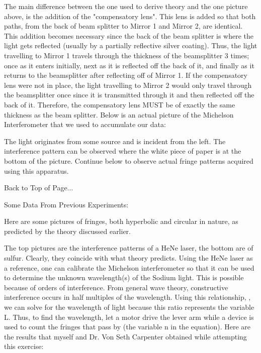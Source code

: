 The main difference between the one used to derive theory and the one picture above, is the addition of the "compensatory lens".   This lens is added so that both paths, from the back of beam splitter to Mirror 1 and Mirror 2, are identical.  This addition becomes necessary since the back of the beam splitter is where the light gets reflected (usually by a partially reflective silver coating).   Thus, the light travelling to Mirror 1 travels through the thickness of the beamsplitter 3 times; once as it enters initially, next as it is reflected off the back of it, and finally as it returns to the beamsplitter after reflecting off of Mirror 1.   If the compensatory lens were not in place, the light travelling to Mirror 2 would only travel through the beamsplitter once since it is transmitted through it and then reflected off the back of it.  Therefore, the compensatory lens MUST be of exactly the same thickness as the beam splitter.  Below is an actual picture of the Michelson Interferometer that we used to accumulate our data:



 

    The light originates from some source and is incident from the left.   The interference pattern can be observed where the white piece of paper is at the bottom of the picture.  Continue below to observe actual fringe patterns acquired using this apparatus. 

Back to Top of Page...

Some Data From Previous Experiments:

    Here are some pictures of fringes, both hyperbolic and circular in nature, as predicted by the theory discussed earlier.





    The top pictures are the interference patterns of a HeNe laser, the bottom are of sulfur.  Clearly, they coincide with what theory predicts.  Using the HeNe laser as a reference, one can calibrate the Michelson interferometer so that it can be used to determine the unknown wavelength(s) of the Sodium light. This is possible because of orders of interference.  From general wave theory, constructive interference occurs in half multiples of the wavelength.  Using this relationship, , we can solve for the wavelength of light because this ratio represents the variable L.  Thus, to find the wavelength, let a motor drive the lever arm while a device is used to count the fringes that pass by (the variable n in the equation).  Here are the results that myself and Dr. Von Seth Carpenter obtained while attempting this exercise:







